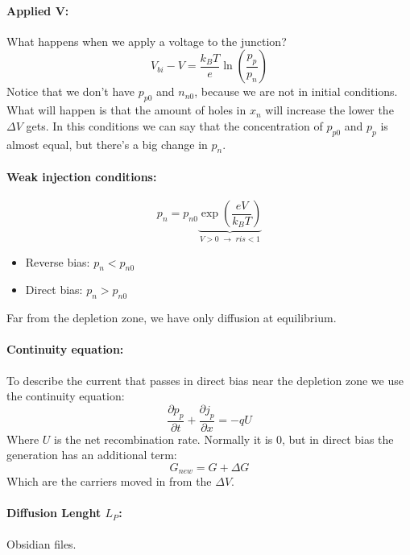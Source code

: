 \paragraph{Applied V:} What happens when we apply a voltage to the junction?
\begin{equation}
    V_{bi} - V = \frac{k_BT}{e}\ln\left(\frac{p_{p}}{p_{n}}\right)
\end{equation}
Notice that we don't have $p_{p0}$ and $n_{n0}$, because we are not in initial conditions. What will happen is that the amount of holes in $x_n$ will increase the lower the $\Delta V$ gets.
In this conditions we can say that the concentration of $p_{p0}$ and $p_{p}$ is almost equal, but there's a big change in $p_n$.

\paragraph{Weak injection conditions:} 
\begin{equation}
    p_n = p_{n0}\underbrace{\exp\left(\frac{eV}{k_BT}\right)}_{V>0\; \rightarrow\; ris<1}
\end{equation}

\begin{itemize}
    \item Reverse bias: $p_n < p_{n0}$ 
    \item Direct bias: $p_n > p_{n0}$
\end{itemize}
Far from the depletion zone, we have only diffusion at equilibrium.

\paragraph{Continuity equation:} 
To describe the current that passes in direct bias near the depletion zone we use the continuity equation:
\begin{equation}
    \frac{\partial p_p}{\partial t} + \frac{\partial j_p}{\partial x} = - q U
\end{equation}
Where $U$ is the net recombination rate. Normally it is 0, but in direct bias the generation has an additional term:
\begin{equation}
    G_{new} = G +\Delta G
\end{equation}
Which are the carriers moved in from the $\Delta V$.

\paragraph{Diffusion Lenght $L_P$:} Obsidian files.
